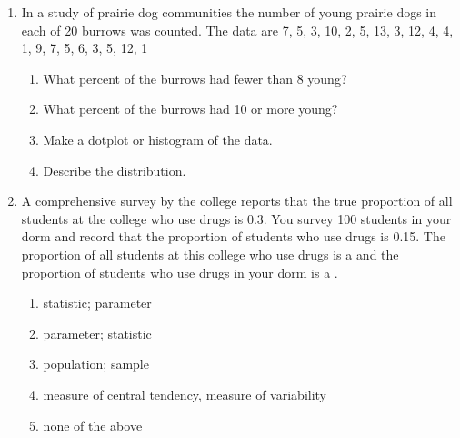 \documentclass[11pt,fullpage]{amsart}
\begin{document}
\begin{enumerate}
\vfill

\item In a study of prairie dog communities the number of young prairie
  dogs in each of 20 burrows was counted.  The data are 7, 5, 3, 10, 2,
  5, 13, 3, 12, 4, 4, 1, 9, 7, 5, 6, 3, 5, 12, 1
  \begin{enumerate}
 
  \item What percent of the burrows had fewer than 8 young?

  \item What percent of the burrows had 10 or more young?

  \item Make a dotplot or histogram of the data.

  \item Describe the distribution.
  

\end{enumerate}

  \vfill

\item
A comprehensive survey by the college reports that the true proportion of all students at the college who use drugs is 0.3.  You survey 100 students in your dorm and record that the proportion of students who use drugs is 0.15.  The proportion of all students at this college who use drugs is a \underline{\hspace{1in}} and the proportion of students who use drugs in your dorm is a \underline{\hspace{1in}}.
\begin{enumerate}
\item   statistic; parameter
\item	parameter; statistic
\item	population; sample
\item measure of central tendency, measure of variability
\item none of the above
\end{enumerate}

\newpage


\end{enumerate}
\end{document}
